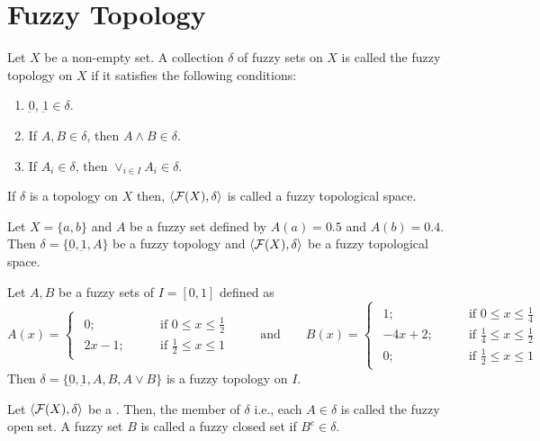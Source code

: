 \documentclass[../main-sheet.tex]{subfiles}
\begin{document}
\chapter{Fuzzy Topology}
\begin{defn}
    Let \(X \) be a non-empty set. A collection \(\delta\) of fuzzy sets on \(X \) is called the fuzzy topology on \(X \) if it satisfies the following conditions:
    \begin{enumerate}[label=(\roman*)]
        \item \(\underbar{0}\), \(\underbar{1}\in\delta\). 
        \item If \(A,B \in \delta\), then \(A\wedge B \in\delta\). 
        \item If \(A_i \in \delta\), then \(\vee_{i\in I}A_i \in\delta\). 
    \end{enumerate}
    If \(\delta\) is a topology on \(X \) then, \(\langle \mathcal{F}(X), \delta \rangle\) is called a fuzzy topological space.
\end{defn}
\begin{ex}
    Let \(X=\{a,b \}\) and \(A \) be a fuzzy set defined by \(A(a)=0.5\) and \(A(b )=0.4\). Then \(\delta=\{\underbar{0},\underbar{1},A \}\) be a fuzzy topology and \(\langle \mathcal{F}(X), \delta \rangle\) be a fuzzy topological space.
\end{ex}
\begin{ex}
    Let \(A, B \) be a fuzzy sets of \(I=[0,1 ]\) defined as
    \[
        A(x)=\begin{cases}
            \begin{aligned}
                0; \qquad&\text{if } 0\leq x\leq\frac{1}{2}\\
                2x-1; \qquad&\text{if }\frac{1}{2} \leq x\leq 1
            \end{aligned}
    \end{cases}
    \qquad\text{and}\qquad
    B(x)=\begin{cases}
        \begin{aligned}
            1; \qquad&\text{if } 0\leq x\leq \frac{1}{4}\\
            -4x+2; \qquad&\text{if }\frac{1}{4}\leq x\leq\frac{1}{2}\\
            0; \qquad&\text{if }\frac{1}{2}\leq x\leq 1
        \end{aligned}
    \end{cases}
    \]
    Then \(\delta=\{\underbar{0},\underbar{1},A,B,A\vee B \}\) is a fuzzy topology on \(I \).
\end{ex}
\begin{defn}
    Let \(\langle \mathcal{F}(X), \delta \rangle\) be a \fts. Then, the member of \(\delta\) i.e., each \(A\in\delta\) is called the fuzzy open set. A fuzzy set \(B \) is called a fuzzy closed set if \(B^c \in\delta\).
\end{defn}
\end{document}
